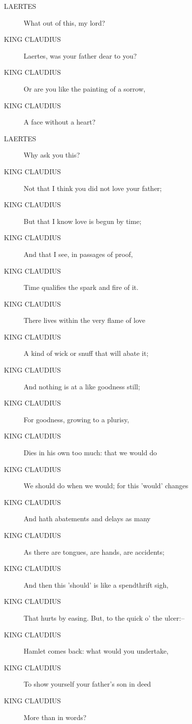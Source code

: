 \documentclass{article}
\begin{document}
\begin{description}
            
\item[LAERTES] What out of this, my lord?
\end{description}
          
\begin{description}
            
\item[KING CLAUDIUS] Laertes, was your father dear to you?
\item[KING CLAUDIUS] Or are you like the painting of a sorrow,
\item[KING CLAUDIUS] A face without a heart?
\end{description}
          
\begin{description}
            
\item[LAERTES] Why ask you this?
\end{description}
          
\begin{description}
            
\item[KING CLAUDIUS] Not that I think you did not love your father;
\item[KING CLAUDIUS] But that I know love is begun by time;
\item[KING CLAUDIUS] And that I see, in passages of proof,
\item[KING CLAUDIUS] Time qualifies the spark and fire of it.
\item[KING CLAUDIUS] There lives within the very flame of love
\item[KING CLAUDIUS] A kind of wick or snuff that will abate it;
\item[KING CLAUDIUS] And nothing is at a like goodness still;
\item[KING CLAUDIUS] For goodness, growing to a plurisy,
\item[KING CLAUDIUS] Dies in his own too much: that we would do
\item[KING CLAUDIUS] We should do when we would; for this 'would' changes
\item[KING CLAUDIUS] And hath abatements and delays as many
\item[KING CLAUDIUS] As there are tongues, are hands, are accidents;
\item[KING CLAUDIUS] And then this 'should' is like a spendthrift sigh,
\item[KING CLAUDIUS] That hurts by easing. But, to the quick o' the ulcer:--
\item[KING CLAUDIUS] Hamlet comes back: what would you undertake,
\item[KING CLAUDIUS] To show yourself your father's son in deed
\item[KING CLAUDIUS] More than in words?
\end{description}
          
\end{document}
